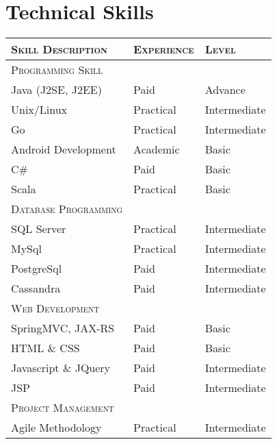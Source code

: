 \documentclass[a4paper,10pt]{article} %
\begin{document}

\section{Technical Skills}

    \begin{tabular}{l|l|l}
   
    \textsc{Skill Description} & \textsc{Experience}  & \textsc{Level} \\ \hline
    \textsc{Programming Skill}\\ \hline
    Java (J2SE, J2EE) & Paid & Advance \\
    Unix/Linux & Practical & Intermediate \\ 
    Go & Practical & Intermediate \\
    Android Development & Academic & Basic\\
    C\# & Paid & Basic \\ 
    Scala & Practical & Basic \\ \hline 
    \textsc{Database Programming} \\ \hline
    SQL Server & Practical & Intermediate \\ 
    MySql & Practical & Intermediate \\ 
    PostgreSql & Paid & Intermediate \\ 
    Cassandra & Paid & Intermediate \\ \hline
    \textsc{Web Development} \\ \hline
    SpringMVC, JAX-RS & Paid & Basic \\ 
    HTML \& CSS & Paid & Basic \\ 
    Javascript \& JQuery & Paid & Intermediate \\ 
    JSP & Paid & Intermediate \\ \hline
    \textsc{Project Management}\\ \hline
    Agile Methodology & Practical & Intermediate \\ 
    \end{tabular}
\end{document}
